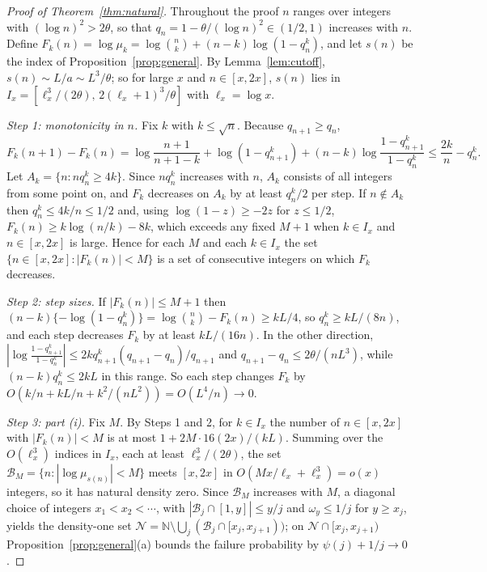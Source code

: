 \documentclass[11pt]{article}
\theoremstyle{remark}
\begin{document}
\begin{proof}[Proof of Theorem~\ref{thm:natural}]
Throughout the proof $n$ ranges over integers with $(\log n)^2>2\theta$, so that $q_n=1-\theta/(\log n)^2\in(1/2,1)$ increases with $n$. Define $F_k(n)=\log\mu_k=\log\binom nk+(n-k)\log(1-q_n^k)$, and let $s(n)$ be the index of Proposition~\ref{prop:general}. By Lemma~\ref{lem:cutoff}, $s(n)\sim L/a\sim L^3/\theta$; so for large $x$ and $n\in[x,2x]$, $s(n)$ lies in $I_x=[\ell_x^3/(2\theta),\,2(\ell_x+1)^3/\theta]$ with $\ell_x=\log x$.

\emph{Step 1: monotonicity in $n$.} Fix $k$ with $k\le\sqrt n$. Because $q_{n+1}\ge q_n$,
\[
 F_k(n+1)-F_k(n)=\log\frac{n+1}{n+1-k}+\log(1-q_{n+1}^k)+(n-k)\log\frac{1-q_{n+1}^k}{1-q_n^k}
 \le\frac{2k}n-q_n^k .
\]
Let $A_k=\{n:nq_n^k\ge4k\}$. Since $nq_n^k$ increases with $n$, $A_k$ consists of all integers from some point on, and $F_k$ decreases on $A_k$ by at least $q_n^k/2$ per step. If $n\notin A_k$ then $q_n^k\le 4k/n\le1/2$ and, using $\log(1-z)\ge-2z$ for $z\le1/2$, $F_k(n)\ge k\log(n/k)-8k$, which exceeds any fixed $M+1$ when $k\in I_x$ and $n\in[x,2x]$ is large. Hence for each $M$ and each $k\in I_x$ the set $\{n\in[x,2x]:|F_k(n)|<M\}$ is a set of consecutive integers on which $F_k$ decreases.

\emph{Step 2: step sizes.} If $|F_k(n)|\le M+1$ then $(n-k)\{-\log(1-q_n^k)\}=\log\binom nk-F_k(n)\ge kL/4$, so $q_n^k\ge kL/(8n)$, and each step decreases $F_k$ by at least $kL/(16n)$. In the other direction, $|\log\frac{1-q_{n+1}^k}{1-q_n^k}|\le 2kq_{n+1}^{k}(q_{n+1}-q_n)/q_{n+1}$ and $q_{n+1}-q_n\le 2\theta/(nL^3)$, while $(n-k)q_n^k\le 2kL$ in this range. So each step changes $F_k$ by $O(k/n+kL/n+k^2/(nL^2))=O(L^4/n)\to0$.

\emph{Step 3: part (i).} Fix $M$. By Steps 1 and 2, for $k\in I_x$ the number of $n\in[x,2x]$ with $|F_k(n)|<M$ is at most $1+2M\cdot16(2x)/(kL)$. Summing over the $O(\ell_x^3)$ indices in $I_x$, each at least $\ell_x^3/(2\theta)$, the set $\mathcal B_M=\{n:|\log\mu_{s(n)}|<M\}$ meets $[x,2x]$ in $O(Mx/\ell_x+\ell_x^3)=o(x)$ integers, so it has natural density zero. Since $\mathcal B_M$ increases with $M$, a diagonal choice of integers $x_1<x_2<\cdots$, with $|\mathcal B_j\cap[1,y]|\le y/j$ and $\omega_y\le1/j$ for $y\ge x_j$, yields the density-one set $\mathcal N=\mathbb N\setminus\bigcup_j(\mathcal B_j\cap[x_j,x_{j+1}))$; on $\mathcal N\cap[x_j,x_{j+1})$ Proposition~\ref{prop:general}(a) bounds the failure probability by $\psi(j)+1/j\to0$.


\end{proof}
\end{document}
